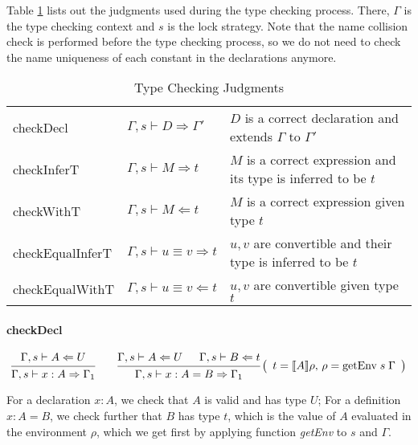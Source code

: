 \documentclass{article}
\theoremstyle{remark}
\begin{document}
Table \ref{tab:judgments} lists out the judgments used during the type checking process. There, $\Gamma$ is the type checking context and $s$ is the lock strategy. Note that the name collision check is performed before the type checking process, so we do not need to check the name uniqueness of each constant in the declarations anymore.
\begin{table}[h]
  \centering
  \begin{tabular}{l l p{2 in}}
    checkDecl   & $\Gamma,s \vdash D \Rightarrow \Gamma'$ & $D$ is a correct declaration and extends $\Gamma$ to $\Gamma'$ \\
    checkInferT & $\Gamma,s \vdash M \Rightarrow t$ & $M$ is a correct expression and its type is inferred to be $t$ \\
    checkWithT  & $\Gamma,s \vdash M \Leftarrow t$ & $M$ is a correct expression given type $t$ \\
    checkEqualInferT & $\Gamma,s \vdash u \equiv v \Rightarrow t $ & $u, v$ are convertible and their type is inferred to be $t$ \\ 
    checkEqualWithT  & $\Gamma,s \vdash u \equiv v \Leftarrow t  $ & $u, v$ are convertible given type $t$ 
  \end{tabular}
  \caption{Type Checking Judgments}
  \label{tab:judgments}
\end{table}

\paragraph{checkDecl}
\[
  \begin{prooftree}
    \hypo{\Gamma,s \vdash A \Leftarrow U}
    \infer1{\Gamma,s \vdash x : A \Rightarrow \Gamma_1}
  \end{prooftree} \quad \quad
  \begin{prooftree}
    \hypo{\Gamma,s \vdash A \Leftarrow U}
    \hypo{\Gamma,s \vdash B \Leftarrow t}
    \infer2{\Gamma,s \vdash x : A = B \Rightarrow \Gamma_1}
  \end{prooftree}\left(\begin{array}{l} t = \llbracket A \rrbracket \rho, \, \rho = \text{getEnv} \; s \; \Gamma\end{array}\right)
\]

For a declaration $x : A$, we check that $A$ is valid and has type $U$; For a definition $x : A = B$, we check further that $B$ has type $t$, which is the value of $A$ evaluated in the environment $\rho$, which we get first by applying function \emph{getEnv} to $s$ and $\Gamma$. 
\end{document}
